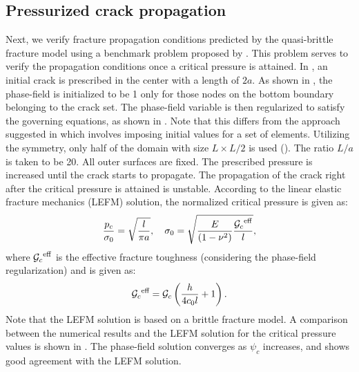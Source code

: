 \subsection{Pressurized crack propagation}
\label{section: Chapter3/verification/propagation}

Next, we verify fracture propagation conditions predicted by the quasi-brittle fracture model using a benchmark problem proposed by \citet{WILSON2016264}. This problem serves to verify the propagation conditions once a critical pressure is attained. In , an initial crack is prescribed in the center with a length of $2a$. As shown in , the phase-field is initialized to be 1 only for those nodes on the bottom boundary belonging to the crack set. The phase-field variable is then regularized to satisfy the governing equations, as shown in . Note that this differs from the approach suggested in \cite{WILSON2016264,YOSHIOKA2020113210} which involves imposing initial values for a set of elements.
Utilizing the symmetry, only half of the domain with size $L \times L/2$ is used (). The ratio $L/a$ is taken to be 20. All outer surfaces are fixed. The prescribed pressure is increased until the crack starts to propagate. The propagation of the crack right after the critical pressure is attained is unstable. According to the linear elastic fracture mechanics (LEFM) solution, the normalized critical pressure is given as:
\begin{equation}
  \dfrac{p_c}{\sigma_0} = \sqrt{\dfrac{l}{\pi a}}, \quad \sigma_0=\sqrt{\dfrac{E}{(1-\nu^2)} \dfrac{{\mathcal{G}_c}^\text{eff}}{l}},
\end{equation}
where ${\mathcal{G}_c}^\text{eff}$ is the effective fracture toughness (considering the phase-field regularization) \cite{Bourding2008,YOSHIOKA2020113210} and is given as:
\begin{equation}
  {\mathcal{G}_c}^\text{eff} = {\mathcal{G}_c}\left(\dfrac{h}{4c_0l}+1\right).
\end{equation}
Note that the LEFM solution is based on a brittle fracture model. A comparison between the numerical results and the LEFM solution for the critical pressure values is shown in . The phase-field solution converges as $\psi_c$ increases, and shows good agreement with the LEFM solution.

